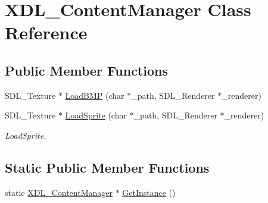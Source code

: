 \hypertarget{class_x_d_l___content_manager}{\section{X\-D\-L\-\_\-\-Content\-Manager Class Reference}
\label{class_x_d_l___content_manager}
}
\subsection*{Public Member Functions}
\begin{DoxyCompactItemize}
\item 
S\-D\-L\-\_\-\-Texture $\ast$ \hyperlink{class_x_d_l___content_manager_a99571fb38d9673ede5cd8598b3081f11}{Load\-B\-M\-P} (char $\ast$\-\_\-path, S\-D\-L\-\_\-\-Renderer $\ast$\-\_\-renderer)
\item 
S\-D\-L\-\_\-\-Texture $\ast$ \hyperlink{class_x_d_l___content_manager_a833df37fbdf51abe274454f4cfee1d0c}{Load\-Sprite} (char $\ast$\-\_\-path, S\-D\-L\-\_\-\-Renderer $\ast$\-\_\-renderer)
\begin{DoxyCompactList}\small\item\em Load\-Sprite. \end{DoxyCompactList}\end{DoxyCompactItemize}
\subsection*{Static Public Member Functions}
\begin{DoxyCompactItemize}
\item 
static \hyperlink{class_x_d_l___content_manager}{X\-D\-L\-\_\-\-Content\-Manager} $\ast$ \hyperlink{class_x_d_l___content_manager_ab1ce9134a3c5a21f8372b0224559cb81}{Get\-Instance} ()
\end{DoxyCompactItemize}


